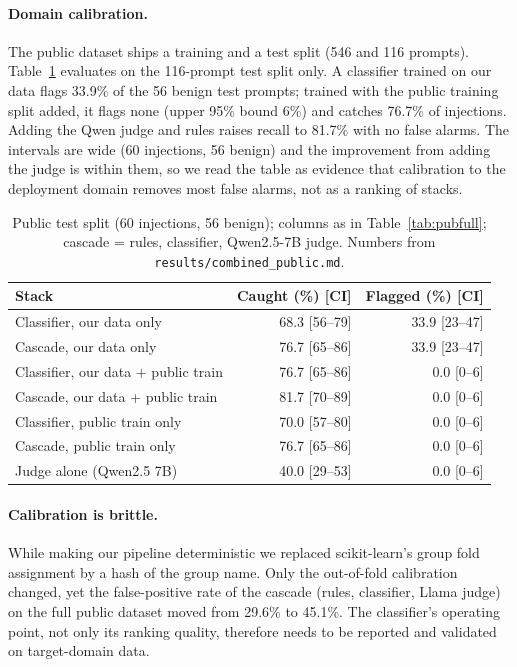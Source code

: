 \documentclass[11pt]{article}
\begin{document}
\paragraph{Domain calibration.} The public dataset ships a training and a test split (546 and 116 prompts). Table~\ref{tab:pubtest}
evaluates on the 116-prompt test split only. A classifier trained on our data flags 33.9\% of the 56 benign test prompts;
trained with the public training split added, it flags none (upper 95\% bound 6\%) and catches 76.7\% of injections. Adding the
Qwen judge and rules raises recall to 81.7\% with no false alarms. The intervals are wide (60 injections, 56 benign) and the
improvement from adding the judge is within them, so we read the table as evidence that calibration to the deployment
domain removes most false alarms, not as a ranking of stacks.
\begin{table}[t]
\centering\small
\begin{tabular}{@{}lrr@{}}
\toprule
Stack & Caught (\%) [CI] & Flagged (\%) [CI] \\
\midrule
Classifier, our data only & 68.3 [56--79] & 33.9 [23--47] \\
Cascade, our data only & 76.7 [65--86] & 33.9 [23--47] \\
Classifier, our data + public train & 76.7 [65--86] & 0.0 [0--6] \\
Cascade, our data + public train & 81.7 [70--89] & 0.0 [0--6] \\
Classifier, public train only & 70.0 [57--80] & 0.0 [0--6] \\
Cascade, public train only & 76.7 [65--86] & 0.0 [0--6] \\
Judge alone (Qwen2.5 7B) & 40.0 [29--53] & 0.0 [0--6] \\
\bottomrule
\end{tabular}
\caption{Public test split (60 injections, 56 benign); columns as in Table~\ref{tab:pubfull}; cascade = rules, classifier, Qwen2.5-7B judge. Numbers from \texttt{results/\allowbreak combined\_public.md}.}\label{tab:pubtest}
\end{table}

\paragraph{Calibration is brittle.} While making our pipeline deterministic we replaced scikit-learn's group fold assignment by a
hash of the group name. Only the out-of-fold calibration changed, yet the false-positive rate of the cascade (rules, classifier,
Llama judge) on the full public dataset moved from 29.6\% to 45.1\%. The classifier's
operating point, not only its ranking quality, therefore needs to be reported and validated on target-domain data.
\end{document}
